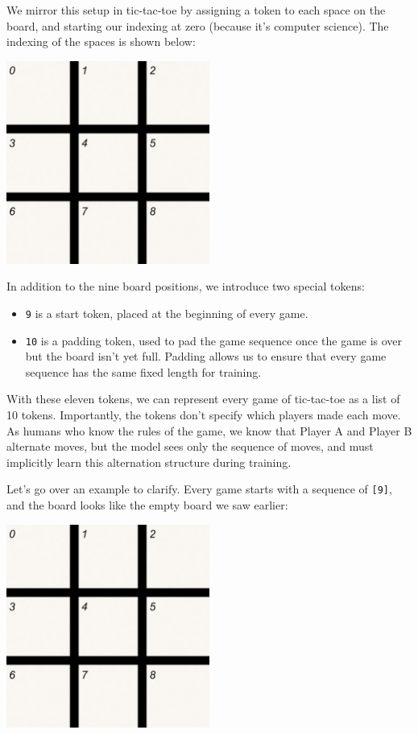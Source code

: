 \documentclass[11pt]{article}
\providecommand{\tightlist}{%
      \setlength{\itemsep}{0pt}\setlength{\parskip}{0pt}}
\begin{document}
We mirror this setup in tic-tac-toe by assigning a token to each space
on the board, and starting our indexing at zero (because it's computer
science). The indexing of the spaces is shown below:

\begin{center}
\includegraphics[width=0.5\textwidth, keepaspectratio]{inserted_images/empty_board_fix.png}
\end{center}

In addition to the nine board positions, we introduce two special
tokens:

\begin{itemize}
\tightlist
\item
  \texttt{9} is a start token, placed at the beginning of every game.
\item
  \texttt{10} is a padding token, used to pad the game sequence once
  the game is over but the board isn't yet full. Padding allows us to ensure
  that every game sequence has the same fixed length for training.
\end{itemize}

With these eleven tokens, we can represent every game of tic-tac-toe as
a list of 10 tokens. Importantly, the tokens don't specify which players
made each move. As humans who know the rules of the game, we know that
Player A and Player B alternate moves, but the model sees only the
sequence of moves, and must implicitly learn this alternation structure
during training.

Let's go over an example to clarify. Every game starts with a sequence
of \texttt{{[}9{]}}, and the board looks like the empty board we saw
earlier:

\begin{center}
\includegraphics[width=0.5\textwidth]{inserted_images/empty_board_fix.png}
\end{center}
\end{document}
